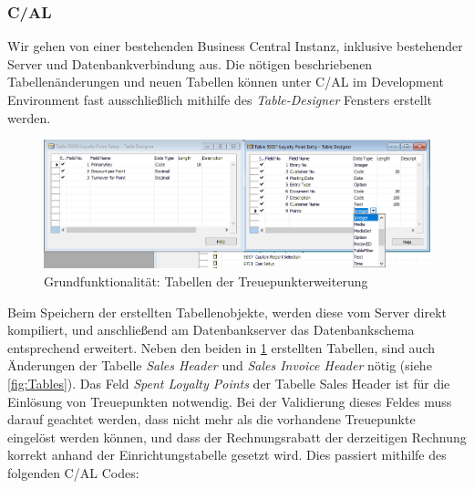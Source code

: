 \subsubsection{C/AL}
Wir gehen von einer bestehenden Business Central Instanz, inklusive bestehender Server und Datenbankverbindung aus. Die nötigen beschriebenen Tabellenänderungen und neuen Tabellen können unter C/AL im Development Environment fast ausschließlich mithilfe des \textit{Table-Designer} Fensters erstellt werden.
\begin{figure}[h]
	\centering
	\includegraphics[width=130mm]{images/CALTableDesigner}
	\caption{Grundfunktionalität: Tabellen der Treuepunkterweiterung}
	\label{fig:Table Designer}
\end{figure}

Beim Speichern der erstellten Tabellenobjekte, werden diese vom Server direkt kompiliert, und anschließend am Datenbankserver das Datenbankschema entsprechend erweitert. Neben den beiden in \ref{fig:Table Designer} erstellten Tabellen, sind auch Änderungen der Tabelle \textit{Sales Header} und \textit{Sales Invoice Header} nötig (siehe \ref{fig:Tables}). Das Feld \textit{Spent Loyalty Points} der Tabelle {Sales Header} ist für die Einlösung von Treuepunkten notwendig. Bei der Validierung dieses Feldes muss darauf geachtet werden, dass nicht mehr als die vorhandene Treuepunkte eingelöst werden können, und dass der Rechnungsrabatt der derzeitigen Rechnung korrekt anhand der Einrichtungstabelle gesetzt wird. Dies passiert mithilfe des folgenden C/AL Codes:

\pagebreak

